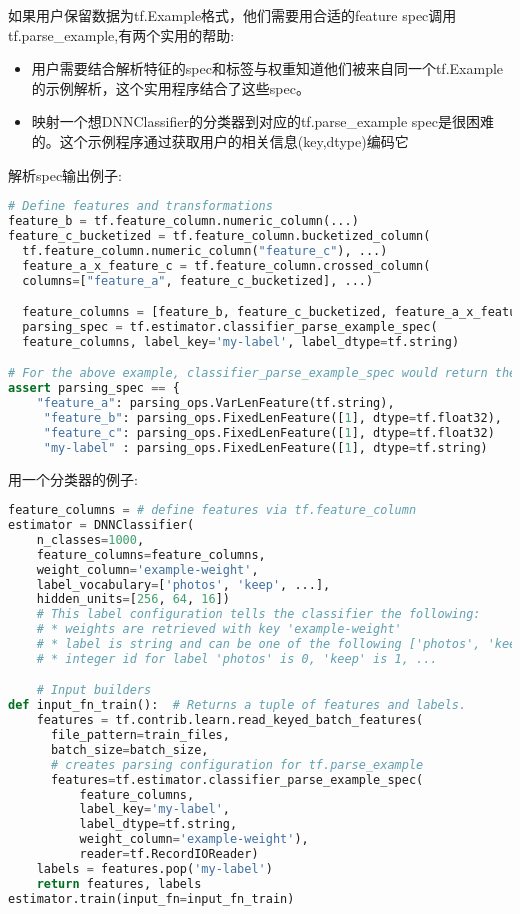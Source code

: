 如果用户保留数据为tf.Example格式，他们需要用合适的feature spec调用tf.parse\_example,有两个实用的帮助:
\begin{itemize}
	\item 用户需要结合解析特征的spec和标签与权重知道他们被来自同一个tf.Example的示例解析，这个实用程序结合了这些spec。
	\item 映射一个想DNNClassifier的分类器到对应的tf.parse\_example spec是很困难的。这个示例程序通过获取用户的相关信息(key,dtype)编码它
\end{itemize}
解析spec输出例子:
\begin{lstlisting}[language=Python]
# Define features and transformations
feature_b = tf.feature_column.numeric_column(...)
feature_c_bucketized = tf.feature_column.bucketized_column(
  tf.feature_column.numeric_column("feature_c"), ...)
  feature_a_x_feature_c = tf.feature_column.crossed_column(
  columns=["feature_a", feature_c_bucketized], ...)

  feature_columns = [feature_b, feature_c_bucketized, feature_a_x_feature_c]
  parsing_spec = tf.estimator.classifier_parse_example_spec(
  feature_columns, label_key='my-label', label_dtype=tf.string)

# For the above example, classifier_parse_example_spec would return the dict:
assert parsing_spec == {
    "feature_a": parsing_ops.VarLenFeature(tf.string),
     "feature_b": parsing_ops.FixedLenFeature([1], dtype=tf.float32),
     "feature_c": parsing_ops.FixedLenFeature([1], dtype=tf.float32)
     "my-label" : parsing_ops.FixedLenFeature([1], dtype=tf.string)			  }
\end{lstlisting}
用一个分类器的例子:
\begin{lstlisting}[language=Python]
feature_columns = # define features via tf.feature_column
estimator = DNNClassifier(
    n_classes=1000,
    feature_columns=feature_columns,
    weight_column='example-weight',
    label_vocabulary=['photos', 'keep', ...],
    hidden_units=[256, 64, 16])
    # This label configuration tells the classifier the following:
    # * weights are retrieved with key 'example-weight'
    # * label is string and can be one of the following ['photos', 'keep', ...]
    # * integer id for label 'photos' is 0, 'keep' is 1, ...

    # Input builders
def input_fn_train():  # Returns a tuple of features and labels.
    features = tf.contrib.learn.read_keyed_batch_features(
      file_pattern=train_files,
      batch_size=batch_size,
      # creates parsing configuration for tf.parse_example
      features=tf.estimator.classifier_parse_example_spec(
          feature_columns,
          label_key='my-label',
          label_dtype=tf.string,
          weight_column='example-weight'),
          reader=tf.RecordIOReader)
    labels = features.pop('my-label')
    return features, labels
estimator.train(input_fn=input_fn_train)
\end{lstlisting}
